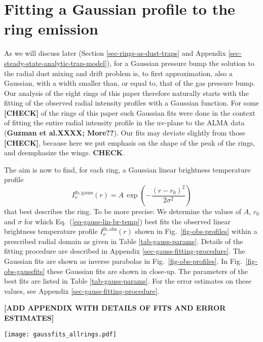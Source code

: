\documentclass{aa}
\begin{document}
\section{Fitting a Gaussian profile to the ring emission}
\label{sec-gauss-fits}
%
As we will discuss later (Section \ref{sec-rings-as-dust-traps} and Appendix
\ref{sec-steady-state-analytic-trap-model}), for a
Gaussian pressure bump the solution to the radial dust mixing and drift problem
is, to first approximation, also a Gaussian, with a width smaller than, or equal
to, that of the gas pressure bump. Our analysis of the eight rings of this paper
therefore naturally starts with the fitting of the observed radial intensity
profiles with a Gaussian function. For some {\bf [CHECK]} of the rings of this
paper such Gaussian fits were done in the context of fitting the entire radial
intensity profile in the uv-plane to the ALMA data ({\bf Guzman et al.XXXX;
  More??}). Our fits may deviate slightly from those {\bf [CHECK]}, because here
we put emphasis on the shape of the peak of the rings, and deemphasize the
wings. {\bf CHECK}.

The aim is now to find, for each ring, a Gaussian linear brightness temperature
profile
\begin{equation}\label{eq-gauss-lin-br-temp}
I_{\nu}^{\mathrm{lb,gauss}}(r) = A\,\exp\left(-\frac{(r-r_0)^2}{2\sigma^2}\right)
\end{equation}
that best describes the ring. To be more precise: We determine the values of
$A$, $r_0$ and $\sigma$ for which Eq.~(\ref{eq-gauss-lin-br-temp}) best fits the
observed linear brightness temperature profile $I_{\nu}^{\mathrm{lb,obs}}(r)$
shown in Fig.~\ref{fig-obs-profiles} within a prescribed radial domain as given
in Table \ref{tab-gauss-params}. Details of the fitting procedure are described
in Appendix \ref{sec-gauss-fitting-procedure}. The Gaussian fits are shown as
inverse parabolas in Fig.\ \ref{fig-obs-profiles}. In
Fig.~\ref{fig-obs-gaussfits} these Gaussian fits are shown in close-up. The
parameters of the best fits are listed in Table \ref{tab-gauss-params}.  For the
error estimates on these values, see Appendix \ref{sec-gauss-fitting-procedure}.

{\bf [ADD APPENDIX WITH DETAILS OF FITS AND ERROR ESTIMATES]}

\begin{figure*}
\centerline{\texttt{[image: gaussfits\_allrings.pdf]}}
\caption{\label{fig-obs-gaussfits}Gaussian fits to the eight rings of this
  paper. The blue curves are the observations, the orange curves are the best fit
  Gaussian profiles. The ``fit range'' bar shows the radial range within which
  the Gauss was fitted to the data. The fit range was chosen to fit the part of
  the curve that, by eye, most resembles a Gaussian. The ``beam'' bar shows the
  FWHM beam size of the observations. The grey band around the blue curve shows
  the estimated uncertainty of the data.}
\end{figure*}
\end{document}
